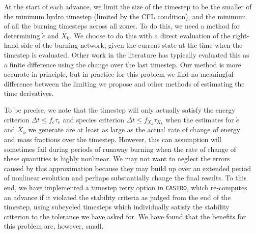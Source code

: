\documentclass[twocolumn,numberedappendix]{../aastex6}
\newcommand{\castro}{\texttt{CASTRO}}
\begin{document}
At the start of each advance, we limit the size of the timestep to be the smaller
of the minimum hydro timestep (limited by the CFL condition), and the minimum of all the
burning timesteps across all zones. To do this, we need a method for determining 
$\dot{e}$ and $\dot{X_k}$. We choose to do this with a direct evaluation of the
right-hand-side of the burning network, given the current state at the time when
the timestep is evaluated. Other work in the literature has typically evaluated
this as a finite difference using the change over the last timestep. Our method
is more accurate in principle, but in practice for this problem we find no
meaningful difference between the limiting we propose and other methods of
estimating the time derivatives.

To be precise, we note that the timestep
will only actually satisfy the energy criterion
$\Delta t \leq f_e \tau_e$ and species criterion
$\Delta t \leq f_{X_k} \tau_{X_k}$ when the estimates for
$\dot{e}$ and $\dot{X_k}$ we generate are at least as large
as the actual rate of change of energy and mass fractions
over the timestep. However, this can assumption will sometimes fail
during periods of runaway burning when the rate of change
of these quantities is highly nonlinear. We may not want
to neglect the errors caused by this approximation
because they may build up over an extended period of nonlinear
evolution and perhaps substantially change the final results.
To this end, we have implemented a timestep retry option in
\castro, which re-computes an advance if it violated the
stability criteria as judged from the end of the timestep,
using subcycled timesteps which individually satisfy the
stability criterion to the tolerance we have asked for.
We have found that the benefits for this problem are, however, small.

\end{document}
